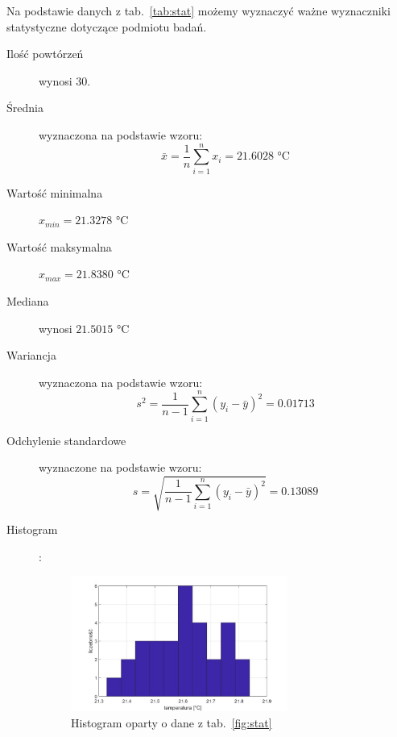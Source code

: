 \documentclass[a4paper, 12pt]{mwart}
\begin{document}
			Na podstawie danych z tab.~\ref{tab:stat} możemy wyznaczyć ważne wyznaczniki statystyczne
			dotyczące podmiotu badań.

			\begin{description}
				\item[Ilość powtórzeń] wynosi 30.
				\item[Średnia] wyznaczona na podstawie wzoru:
					$$ \bar{x} = \frac{1}{n} \sum_{i=1}^n x_i =  21.6028 \text{ °C}$$
			\end{description}

			\begin{description}
				\item[Wartość minimalna] $x_{min} = 21.3278 \text{ °C}$
				\item[Wartość maksymalna] $x_{max} = 21.8380 \text{ °C}$ 
				\item[Mediana] wynosi $21.5015 \text{ °C}$
				\item[Wariancja] wyznaczona na podstawie wzoru:
					$$ s^2 = \frac{1}{n - 1} \sum_{i=1}^n (y_i - \bar{y})^2 = 0.01713$$
				\item[Odchylenie standardowe] wyznaczone na podstawie wzoru:
					$$ s = \sqrt{\frac{1}{n - 1} \sum_{i=1}^n (y_i - \bar{y})^2} = 0.13089$$
			\newpage
				\item[Histogram]:
					\begin{figure}[h]
						\begin{center}
							\includegraphics[width = 0.7\textwidth]{graphs/hist.jpg}
							\caption{Histogram oparty o dane z tab.~\ref{fig:stat}}
							\label{fig:hist}
						\end{center}
					\end{figure}
			\end{description}
\end{document}
